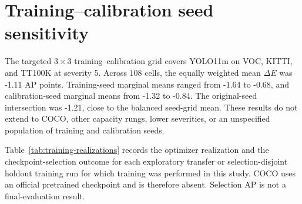 \documentclass[10pt]{article}
\newcommand{\DeltaE}{\Delta E}
\begin{document}
\FloatBarrier

\section{Training--calibration seed sensitivity}

The targeted $3\times3$ training--calibration grid covers YOLO11m on VOC,
KITTI, and TT100K at severity 5. Across 108 cells, the equally weighted mean
$\DeltaE$ was -1.11 AP points. Training-seed marginal means ranged from -1.64
to -0.68, and calibration-seed marginal means from -1.32 to -0.84. The
original-seed intersection was -1.21, close to the balanced seed-grid mean.
These results do not extend to COCO, other capacity rungs, lower severities, or
an unspecified population of training and calibration seeds.

Table~\ref{tab:training-realizations} records the optimizer realization and the
checkpoint-selection outcome for each exploratory transfer or selection-disjoint holdout
training run for which training was performed in this study. COCO uses an
official pretrained checkpoint and is therefore absent. Selection AP is not a
final-evaluation result.

\begin{table}[htbp]
\centering
\caption{Training realizations and selected best epochs. Effective weight
decay records the realized batch/accumulation scaling. AP values are on the
0--100 scale and refer only to the checkpoint-selection partition.}
\label{tab:training-realizations}
\scriptsize
\resizebox{\textwidth}{!}{}
\end{table}
\end{document}

